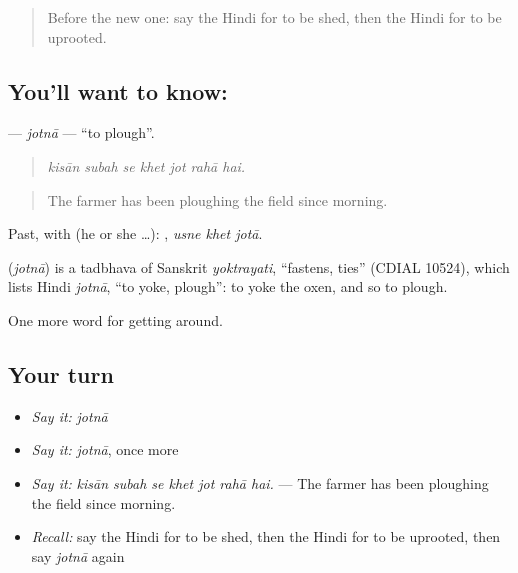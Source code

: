 \label{lesson:HI-C450-jotna}



\begin{quote}
Before the new one: say the Hindi for to be shed, then the Hindi for to be uprooted.
\end{quote}

\subsection*{You'll want to know: }
\textbf{} — \emph{jotnā} — \textquotedblleft{}to plough\textquotedblright{}.

\begin{quote}
      
\end{quote}

\begin{quote}
\emph{kisān subah se khet jot rahā hai.}
\end{quote}

\begin{quote}
The farmer has been ploughing the field since morning.
\end{quote}

Past, with  (he or she …):   , \emph{usne khet jotā}.

\begin{cousinweb}
\textbf{} (\emph{jotnā}) is a tadbhava of Sanskrit \emph{yoktrayati}, \textquotedblleft{}fastens, ties\textquotedblright{} (CDIAL 10524), which lists Hindi \emph{jotnā}, \textquotedblleft{}to yoke, plough\textquotedblright{}: to yoke the oxen, and so to plough.
\end{cousinweb}

\begin{grammarlens}[title={What you've built}]
One more word for getting around.
\end{grammarlens}

\subsection*{Your turn}
\begin{itemize}
\raggedright
  \item \emph{Say it:} \emph{jotnā}
  \item \emph{Say it:} \emph{jotnā}, once more
  \item \emph{Say it:} \emph{kisān subah se khet jot rahā hai.} — The farmer has been ploughing the field since morning.
  \item \emph{Recall:} say the Hindi for to be shed, then the Hindi for to be uprooted, then say \emph{jotnā} again
\end{itemize}

